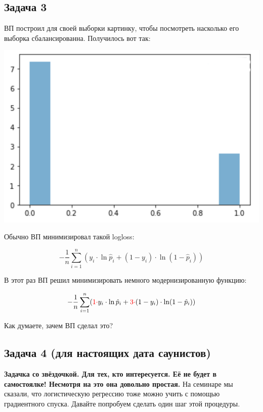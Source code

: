 \documentclass[12pt, a4paper, oneside]{article}
\begin{document}
\subsection*{Задача 3}

ВП построил для своей выборки картинку, чтобы посмотреть насколько его выборка сбалансированна. Получилось вот так: 

\begin{center}
	\includegraphics[scale=0.25]{balance_logloss.png}
\end{center}

Обычно ВП минимизировал такой logloss: 

$$
- \frac{1}{n} \sum_{i=1}^n (y_i \cdot \ln \hat p_i + (1 - y_i) \cdot \ln( 1 - \hat p_i)) 
$$

В этот раз ВП решил минимизировать немного модернизированную функцию: 

$$
- \frac{1}{n} \sum_{i=1}^n ({\color{red} 1 \cdot} y_i \cdot \ln \hat p_i + {\color{red} 3 \cdot} (1 - y_i) \cdot \ln( 1 - \hat p_i)) 
$$

Как думаете, зачем ВП сделал это? 




\subsection*{Задача 4 (для настоящих дата саунистов)}

\textbf{Задачка со звёздочкой. Для тех, кто интересуется. Её не будет в самостоялке! Несмотря на это она довольно простая.} На семинаре мы сказали, что логистическую регрессию тоже можно учить с помощью градиентного спуска. Давайте попробуем сделать один шаг этой процедуры. 
\end{document}
